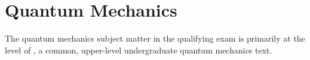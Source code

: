 \newpage
\chapter{Quantum Mechanics}
\label{sec:qmech}
The quantum mechanics subject matter in the qualifying exam is primarily at the level of \cite{griffithsIntroductionQuantumMechanics2018}, a common, upper-level undergraduate quantum mechanics text.

